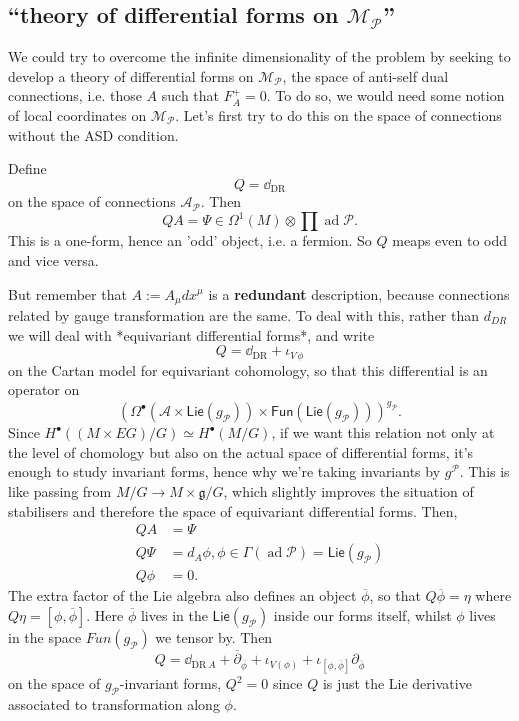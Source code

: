 \documentclass[leqno, openany]{memoir}
\theoremstyle{definition}
\theoremstyle{remark}
\theoremstyle{plain}
\theoremstyle{definition}
\theoremstyle{remark}
\newcommand{\mc}[1]{\mathcal{#1}}
\newcommand{\mr}[1]{\mathrm{#1}}
\newcommand{\ms}[1]{\mathsf{#1}}
\DeclareMathOperator{\ad}{ad}
\begin{document}
\subsection{``theory of differential forms on $\mathcal{M}_{\mathcal{P}}$''}
We could try to overcome the infinite dimensionality of the problem by seeking to develop a theory of differential forms on $\mathcal{M}_{\mathcal{P}}$, the space of anti-self dual connections, i.e. those $A$ such that $F_{A}^{+} = 0$. To do so, we would need some notion of local coordinates on $\mathcal{M}_{\mathcal{P}}$. Let's first try to do this on the space of connections without the ASD condition.

Define
\[
Q = \dd_{\mr{DR}}
\]
on the space of connections $\mathcal{A}_{\mathcal{P}}$.  Then
\[
QA = \Psi \in \Omega^{1}(M) \otimes \prod  \ad  \mc{P}.
\]
This is a one-form, hence an 'odd' object, i.e. a fermion. So $Q$ meaps even to odd and vice versa.


But remember that $A := A_{\mu} dx^{\mu}$ is a \textbf{redundant} description, because connections related by gauge transformation are the same.  To deal with this, rather than $d_{DR}$ we will deal with *equivariant differential forms*, and write
\[
Q = \dd_{\mr{DR}} + \iota_{V\, \phi}
\]
on the Cartan model for equivariant cohomology, so that this differential is an operator on
\[
(\Omega^{\bullet} (\mathcal{A} \times \ms{Lie}(g_{\mathcal{P}})) \times \ms{Fun}(\ms{Lie}(g_{\mathcal{P}})))^{g_{\mathcal{P}}}.
\]
Since $H^{\bullet}( (M \times EG)/G) \simeq H^{\bullet}(M/G)$, if we want this relation not only at the level of chomology but also on the actual space of differential forms, it's enough to study invariant forms, hence why we're taking invariants by $g^{\mathcal{P}}$.
This is like passing from $M/G \to M \times \mathfrak{g}/G$, which slightly improves the situation of stabilisers and therefore the space of equivariant differential forms.
Then,
\begin{align}
    QA &= \Psi
  \\
    Q\Psi &= d_{A} \phi, \phi \in \Gamma(\ad\mathcal{P}) = \ms{Lie}(g_{\mathcal{P}})
  \\
    Q\phi &= 0.
\end{align}
The extra factor of the Lie algebra also defines an object $\overline{\phi}$, so that $Q \overline{\phi} = \eta$ where $Q \eta = [\phi, \overline{\phi}]$.  Here $\overline{\phi}$ lives in the $\ms{Lie}(g_{\mathcal{P}})$ inside our forms itself, whilst $\phi$ lives in the space $Fun(g_{\mathcal{P}})$ we tensor by.  Then
\[
Q = \dd_{\mr{DR}\ A} + \overline{\partial}_{\overline{\phi}} + \iota_{V(\phi)} + \iota_{[\phi,\overline{\phi}]} \partial_{\overline{\phi}}
\]
on the space of $g_{\mathcal{P}}$-invariant forms, $Q^{2} = 0$ since $Q$ is just the Lie derivative associated to transformation along $\phi$.
\end{document}
